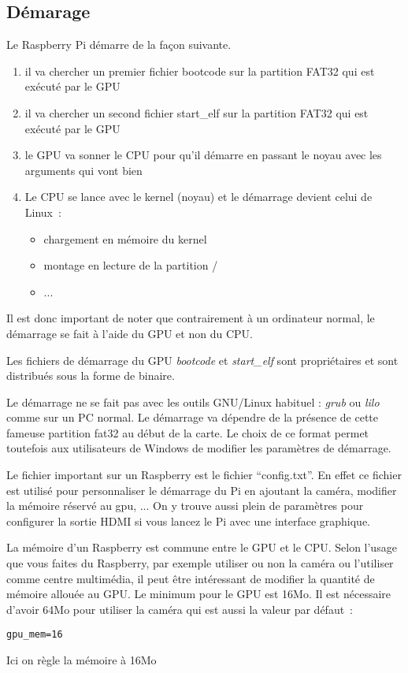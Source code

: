 \subsection{Démarage}
Le Raspberry Pi démarre de la façon suivante. 

\begin{enumerate}
	\item il va chercher un premier fichier bootcode sur la partition FAT32 qui est exécuté par le GPU
	\item il va chercher un second fichier start\_elf sur la partition FAT32 qui est exécuté par le GPU
	\item le GPU va sonner le CPU pour qu'il démarre en passant le noyau avec les arguments qui vont bien
	\item Le CPU se lance avec le kernel (noyau) et le démarrage devient celui de Linux~:
		\begin{itemize}
			\item chargement en mémoire du kernel
			\item montage en lecture de la partition /
			\item ...
		\end{itemize}
\end{enumerate}

Il est donc important de noter que contrairement à un ordinateur normal, le démarrage se fait à l'aide du GPU et non du CPU.

Les fichiers de démarrage du GPU \emph{bootcode} et \emph{start\_elf} sont propriétaires et sont distribués sous la forme de binaire.

Le démarrage ne se fait pas avec les outils GNU/Linux habituel : \emph{grub} ou \emph{lilo} comme sur un PC normal. Le démarrage va dépendre de la présence de cette fameuse partition fat32 au début de la carte. Le choix de ce format permet toutefois aux utilisateurs de Windows de modifier les paramètres de démarrage.

Le fichier important sur un Raspberry est le fichier ``config.txt''. En effet ce fichier est utilisé pour personnaliser le démarrage du Pi en ajoutant la caméra, modifier la mémoire réservé au gpu, ... On y trouve aussi plein de paramètres pour configurer la sortie HDMI si vous lancez le Pi avec une interface graphique.

La mémoire d'un Raspberry est commune entre le GPU et le CPU. Selon l'usage que vous faites du Raspberry, par exemple utiliser ou non la caméra ou l'utiliser comme centre multimédia, il peut être intéressant de modifier la quantité de mémoire allouée au GPU. Le minimum pour le GPU est 16Mo. Il est nécessaire d'avoir 64Mo pour utiliser la caméra qui est aussi la valeur par défaut~:
\begin{verbatim}
gpu_mem=16
\end{verbatim} 
Ici on règle la mémoire à 16Mo

